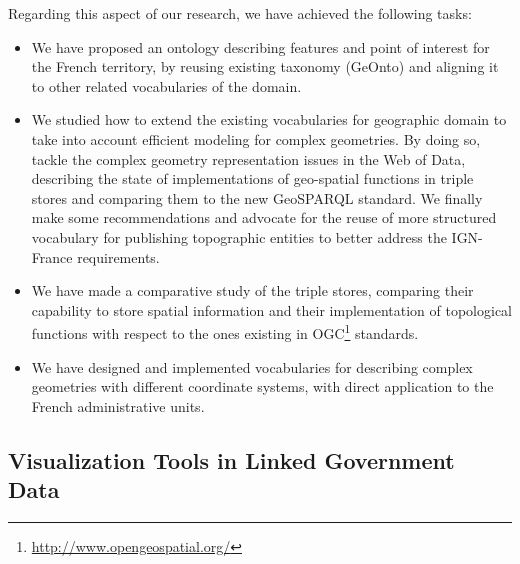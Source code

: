 Regarding this aspect of our research, we have achieved the following tasks:
 \begin{itemize}
  \item We have proposed an ontology describing features and point of interest for the French territory, by reusing existing taxonomy (GeOnto) and aligning it to other related vocabularies of the domain.
  \item  We studied how to extend the existing vocabularies for geographic domain to take into account efficient modeling for complex geometries. By doing so, tackle the complex geometry representation issues in the Web of Data, describing the state of implementations of geo-spatial functions in triple stores and comparing them to the new GeoSPARQL standard.  We finally make some recommendations and advocate for the reuse of more structured vocabulary for publishing topographic entities to better address the IGN-France requirements.
  
 \item We have made a comparative study of the triple stores, comparing their capability to store spatial information and their implementation of topological functions with respect to the ones 
existing in OGC\footnote{\url{http://www.opengeospatial.org/}} standards.
 \item  We have designed and implemented vocabularies for describing complex geometries with different coordinate systems, with direct application to the French administrative units.
 

\end{itemize}

 

\subsection{Visualization Tools in Linked Government Data} \label{visu}

